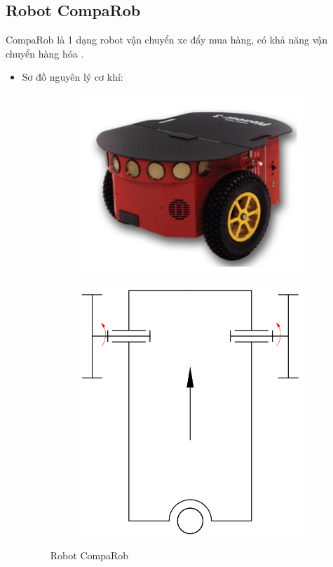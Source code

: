     \subsection{Robot CompaRob}
        \hspace*{0.6cm} CompaRob là 1 dạng robot vận chuyển xe đẩy mua hàng, có khả năng vận chuyển hàng hóa \cite{comparob_robot}.
        \begin{itemize}
            \item Sơ đồ nguyên lý cơ khí:
            \begin{figure}[H]
                \begin{subfigure}{0.5\textwidth}
                \centering
                \includegraphics[width=0.6\linewidth, right]{pictures/chapter1/chapter1_pic11a_comparob.png} 
                \label{chap1_pic11a}
                \end{subfigure}
                \begin{subfigure}{0.6\textwidth}
                \includegraphics[width=0.5\linewidth]{pictures/chapter1/chapter1_pic11b_pinto.png}
                \label{chap1_pic11b}
                \end{subfigure}
                \caption{Robot CompaRob}
                \label{chap1_pic11}

\end{figure}
\end{itemize}
